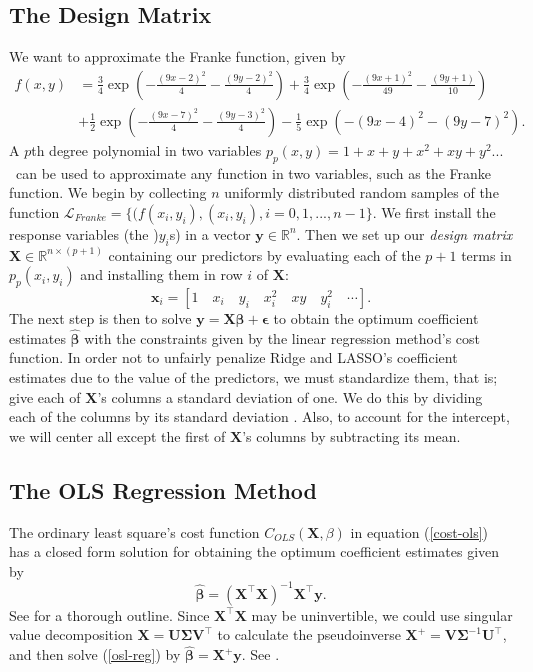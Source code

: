 \documentclass[]{article}
\begin{document}
\subsection{The Design Matrix}
We want to approximate the Franke function, given by
\begin{equation}
\label{franke}
\begin{aligned}
f(x,y) &= \frac{3}{4}\exp{\left(-\frac{(9x-2)^2}{4} - \frac{(9y-2)^2}{4}\right)}+\frac{3}{4}\exp{\left(-\frac{(9x+1)^2}{49}- \frac{(9y+1)}{10}\right)} \\
&+\frac{1}{2}\exp{\left(-\frac{(9x-7)^2}{4} - \frac{(9y-3)^2}{4}\right)} -\frac{1}{5}\exp{\left(-(9x-4)^2 - (9y-7)^2\right) }.
\end{aligned}
\end{equation}
A $p$th degree polynomial in two variables $p_p(x,y) = 1 + x + y + x^2 + xy + y^2 ...$ can be used to approximate any function in two variables, such as the Franke function. We begin by collecting $n$ uniformly distributed random samples of the function $\mathcal{L}_{Franke} = \{(f(x_i, y_i), (x_i, y_i), i=0,1,...,n-1\}$. We first install the response variables (the )$y_i$s) in a vector $\mathbf{y} \in \mathbb{R}^n$. Then we set up our \textit{design matrix} $\mathbf{X} \in \mathbb{R}^{n \times (p+1)}$ containing our predictors by evaluating each of the $p+1$ terms in $p_p(x_i,y_i)$ and installing them in row $i$ of $\mathbf{X}$:
\begin{equation}
\mathbf{x}_i = [1 \quad x_i \quad y_i \quad x_i^2 \quad xy \quad y_i^2 \quad \cdots].
\end{equation}
The next step is then to solve $\mathbf{y} = \mathbf{X\beta} + \mathbf{\epsilon}$ to obtain the optimum coefficient estimates $\mathbf{\hat{\beta}}$ with the constraints given by the linear regression method's cost function. In order not to unfairly penalize Ridge and LASSO's coefficient estimates due to the value of the predictors, we must standardize them, that is; give each of $\mathbf{X}$'s columns a standard deviation of one. We do this by dividing each of the columns by its standard deviation \cite{james2013introduction}. Also, to account for the intercept, we will center all except the first of $\mathbf{X}$'s columns by subtracting its mean.

\subsection{The OLS Regression Method}
The ordinary least square's cost function $C_{OLS}(\mathbf{X},\mathbb{\beta})$ in equation (\ref{cost-ols}) has a closed form solution for obtaining the optimum coefficient estimates given by
\begin{equation}
\label{osl-reg}
	\mathbf{\hat{\beta}} = (\mathbf{X}^\intercal \mathbf{X})^{-1} \mathbf{X}^\intercal \mathbf{y}.
\end{equation}
See \cite{van2015lecture} for a thorough outline. Since $\mathbf{X}^\intercal \mathbf{X}$ may be uninvertible, we could use singular value decomposition $\mathbf{X} = \mathbf{U \Sigma V}^\intercal$ to calculate the pseudoinverse $\mathbf{X}^+ = \mathbf{V \Sigma}^{-1} \mathbf{U}^\intercal$, and then solve (\ref{osl-reg}) by $\mathbf{\hat{\beta}} = \mathbf{X}^+ \mathbf{y}$. See \cite{lay2016linear}.
\end{document}
